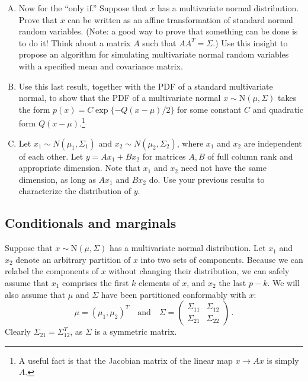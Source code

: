 \documentclass{mynotes}
\newcommand{\N}{\mbox{N}}
\begin{document}
\begin{enumerate}[(A)]
\item Now for the ``only if.''  Suppose that $x$ has a multivariate normal distribution.  Prove that $x$ can be written as an affine transformation of standard normal random variables.  (Note: a good way to prove that something can be done is to do it!  Think about a matrix $A$ such that $A A^T = \Sigma$.)  Use this insight to propose an algorithm for simulating multivariate normal random variables with a specified mean and covariance matrix.

\item Use this last result, together with the PDF of a standard multivariate normal, to show that the PDF of a multivariate normal $x \sim \N(\mu, \Sigma)$ takes the form $p(x) = C \exp\{-Q(x-\mu)/2\}$ for some constant $C$ and quadratic form $Q(x-\mu)$.\footnote{A useful fact is that the Jacobian matrix of the linear map $x \rightarrow Ax$ is simply $A$.}


\item Let $x_1 \sim N(\mu_1, \Sigma_1)$ and $x_2 \sim N(\mu_2, \Sigma_2)$, where $x_1$ and $x_2$ are independent of each other.  Let $y = A x_1 + B x_2$ for matrices $A,B$ of full column rank and appropriate dimension.  Note that $x_1$ and $x_2$ need not have the same dimension, as long as $A x_1$ and $B x_2$ do.  Use your previous results to characterize the distribution of $y$.

\end{enumerate}

\subsection{Conditionals and marginals}

Suppose that $x \sim \N(\mu, \Sigma)$ has a multivariate normal distribution.  Let $x_1$ and $x_2$ denote an arbitrary partition of $x$ into two sets of components.  Because we can relabel the components of $x$ without changing their distribution, we can safely assume that $x_1$ comprises the first $k$ elements of $x$, and $x_2$ the last $p-k$.  We will also assume that $\mu$ and $\Sigma$ have been partitioned conformably with $x$:
$$
\mu = (\mu_1, \mu_2)^T \quad \mbox{and} \quad \Sigma =
\left(
\begin{array}{cc}
\Sigma_{11} & \Sigma_{12} \\
\Sigma_{21} & \Sigma_{22} 
\end{array}
\right) \, .
$$
Clearly $\Sigma_{21} = \Sigma_{12}^T$, as $\Sigma$ is a symmetric matrix.
\end{document}
